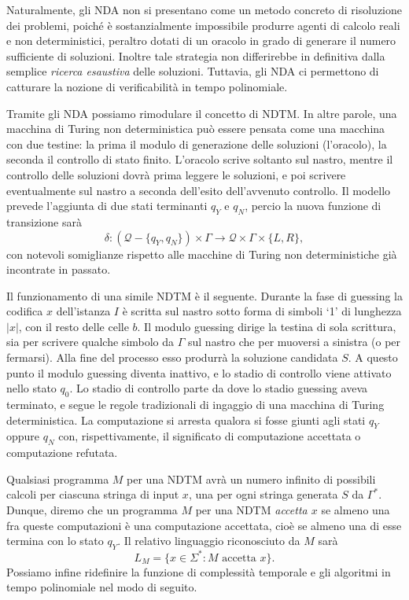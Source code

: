 \documentclass[10pt]{\classname}
\theoremstyle{newlinethm}
\theoremstyle{theorem}
\theoremstyle{definition}
\theoremstyle{definition}
\theoremstyle{definition}
\theoremstyle{definition}
\begin{document}
Naturalmente, gli NDA non si presentano come un metodo concreto di risoluzione dei problemi, poiché è sostanzialmente impossibile produrre agenti di calcolo reali e non deterministici, peraltro dotati di un oracolo in grado di generare il numero sufficiente di soluzioni. Inoltre tale strategia non differirebbe in definitiva dalla semplice \emph{ricerca esaustiva} delle soluzioni. Tuttavia, gli NDA ci permettono di catturare la nozione di verificabilità in tempo polinomiale.

Tramite gli NDA possiamo rimodulare il concetto di NDTM. In altre parole, una macchina di Turing non deterministica può essere pensata come una macchina con due testine: la prima il modulo di generazione delle soluzioni (l'oracolo), la seconda il controllo di stato finito. L'oracolo scrive soltanto sul nastro, mentre il controllo delle soluzioni dovrà prima leggere le soluzioni, e poi scrivere eventualmente sul nastro a seconda dell'esito dell'avvenuto controllo. Il modello prevede l'aggiunta di due stati terminanti $q_Y$ e $q_N$, percio la nuova funzione di transizione sarà \[\delta:(\mathcal Q - \{q_Y, q_N\}) \times \Gamma \rightarrow \mathcal Q \times \Gamma \times \{L, R\},\] con notevoli somiglianze rispetto alle macchine di Turing non deterministiche già incontrate in passato.

Il funzionamento di una simile NDTM è il seguente. Durante la fase di guessing la codifica $x$ dell'istanza $I$ è scritta sul nastro sotto forma di simboli `1' di lunghezza $|x|$, con il resto delle celle $b$. Il modulo guessing dirige la testina di sola scrittura, sia per scrivere qualche simbolo da $\Gamma$ sul nastro che per muoversi a sinistra (o per fermarsi). Alla fine del processo esso produrrà la soluzione candidata $S$. A questo punto il modulo guessing diventa inattivo, e lo stadio di controllo viene attivato nello stato $q_0$. Lo stadio di controllo parte da dove lo stadio guessing aveva terminato, e segue le regole tradizionali di ingaggio di una macchina di Turing deterministica. La computazione si arresta qualora si fosse giunti agli stati $q_Y$ oppure $q_N$ con, rispettivamente, il significato di computazione accettata o computazione refutata.

Qualsiasi programma $M$ per una NDTM avrà un numero infinito di possibili calcoli per ciascuna stringa di input $x$, una per ogni stringa generata $S$ da $\Gamma^*$. Dunque, diremo che un programma $M$ per una NDTM \emph{accetta $x$} se almeno una fra queste computazioni è una computazione accettata, cioè se almeno una di esse termina con lo stato $q_Y$. Il relativo linguaggio riconosciuto da $M$ sarà \[L_M = \{x \in \Sigma^*: M \mbox{ accetta } x\}.\] Possiamo infine ridefinire la funzione di complessità temporale e gli algoritmi in tempo polinomiale nel modo di seguito.
\end{document}
